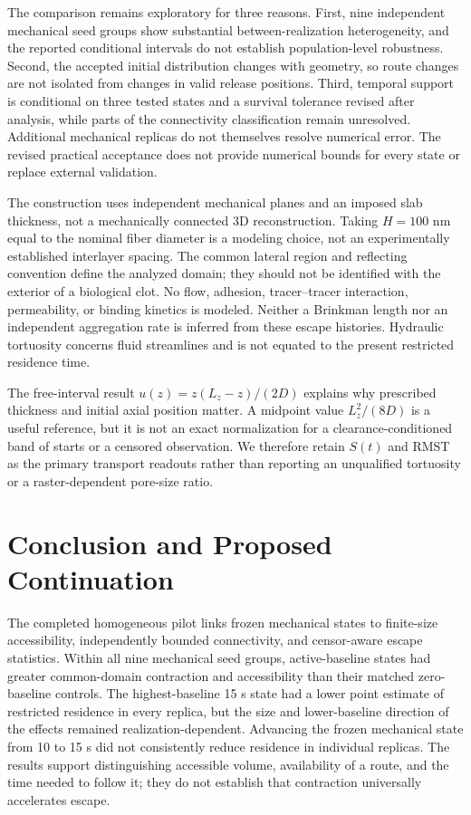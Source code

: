 The comparison remains exploratory for three reasons. First, nine independent mechanical seed groups show substantial between-realization heterogeneity, and the reported conditional intervals do not establish population-level robustness. Second, the accepted initial distribution changes with geometry, so route changes are not isolated from changes in valid release positions. Third, temporal support is conditional on three tested states and a survival tolerance revised after analysis, while parts of the connectivity classification remain unresolved. Additional mechanical replicas do not themselves resolve numerical error. The revised practical acceptance does not provide numerical bounds for every state or replace external validation.

The construction uses independent mechanical planes and an imposed slab thickness, not a mechanically connected 3D reconstruction. Taking $H=100$ nm equal to the nominal fiber diameter is a modeling choice, not an experimentally established interlayer spacing. The common lateral region and reflecting convention define the analyzed domain; they should not be identified with the exterior of a biological clot. No flow, adhesion, tracer--tracer interaction, permeability, or binding kinetics is modeled. Neither a Brinkman length nor an independent aggregation rate is inferred from these escape histories. Hydraulic tortuosity concerns fluid streamlines \cite{Duda2011} and is not equated to the present restricted residence time.

The free-interval result $u(z)=z(L_z-z)/(2D)$ \cite[Chap.~2]{Redner2001} explains why prescribed thickness and initial axial position matter. A midpoint value $L_z^2/(8D)$ is a useful reference, but it is not an exact normalization for a clearance-conditioned band of starts or a censored observation. We therefore retain $S(t)$ and RMST as the primary transport readouts rather than reporting an unqualified tortuosity or a raster-dependent pore-size ratio.

\section{Conclusion and Proposed Continuation}
The completed homogeneous pilot links frozen mechanical states to finite-size accessibility, independently bounded connectivity, and censor-aware escape statistics. Within all nine mechanical seed groups, active-baseline states had greater common-domain contraction and accessibility than their matched zero-baseline controls. The highest-baseline 15 s state had a lower point estimate of restricted residence in every replica, but the size and lower-baseline direction of the effects remained realization-dependent. Advancing the frozen mechanical state from 10 to 15 s did not consistently reduce residence in individual replicas. The results support distinguishing accessible volume, availability of a route, and the time needed to follow it; they do not establish that contraction universally accelerates escape.

